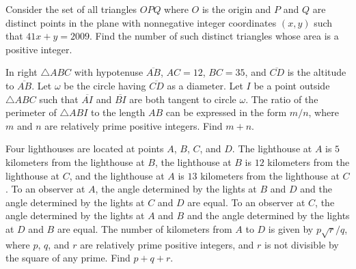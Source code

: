 \begin{question}[name={2009 AIME I, \href{https://artofproblemsolving.com/community/c4p1439455}{Problem 11}}]
	Consider the set of all triangles $ OPQ$ where $ O$ is the origin and $ P$ and $ Q$ are distinct points in the plane with nonnegative integer coordinates $ (x,y)$ such that $ 41x+y = 2009$. Find the number of such distinct triangles whose area is a positive integer.
\end{question}


%	












\begin{question}[name={2009 AIME I, \href{https://artofproblemsolving.com/community/c4p1439446}{Problem 12}}]
	In right $ \triangle ABC$ with hypotenuse $ \overline{AB}$, $ AC = 12$, $ BC = 35$, and $ \overline{CD}$ is the altitude to $ \overline{AB}$. Let $ \omega$ be the circle having $ \overline{CD}$ as a diameter. Let $ I$ be a point outside $ \triangle ABC$ such that $ \overline{AI}$ and $ \overline{BI}$ are both tangent to circle $ \omega$. The ratio of the perimeter of $ \triangle ABI$ to the length $ AB$ can be expressed in the form $ {m}/{n}$, where $ m$ and $ n$ are relatively prime positive integers. Find $ m+n$.	
\end{question}


%	














\begin{question}[name={2009 AIME II, \href{https://artofproblemsolving.com/community/c4p1455388}{Problem 10}}]
	Four lighthouses are located at points $ A$, $ B$, $ C$, and $ D$. The lighthouse at $ A$ is $ 5$ kilometers from the lighthouse at $ B$, the lighthouse at $ B$ is $ 12$ kilometers from the lighthouse at $ C$, and the lighthouse at $ A$ is $ 13$ kilometers from the lighthouse at $ C$. To an observer at $ A$, the angle determined by the lights at $ B$ and $ D$ and the angle determined by the lights at $ C$ and $ D$ are equal. To an observer at $ C$, the angle determined by the lights at $ A$ and $ B$ and the angle determined by the lights at $ D$ and $ B$ are equal. The number of kilometers from $ A$ to $ D$ is given by $ {p\sqrt{r}}/{q}$, where $ p$, $ q$, and $ r$ are relatively prime positive integers, and $ r$ is not divisible by the square of any prime. Find $p+q+r$.
\end{question}


